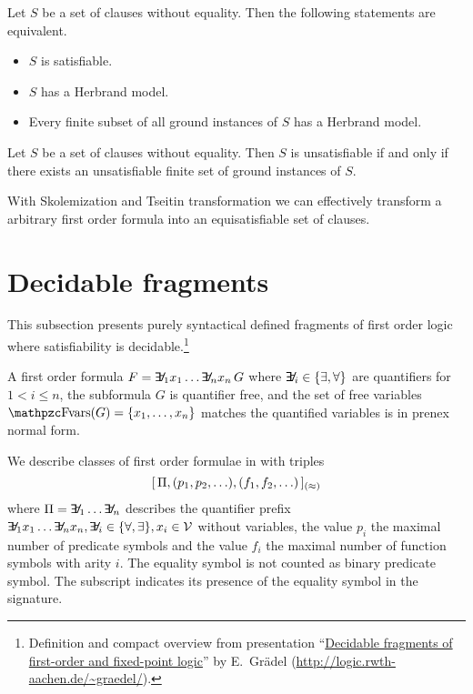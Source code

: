 \begin{theorem}[Herbrand]\label{the:herbrand}
	Let $S$ be a set of clauses without equality. Then the following statements are equivalent.
	\begin{itemize}
		\item $S$ is satisfiable.
		\item $S$ has a Herbrand model.
		\item Every finite subset of all ground instances of $S$ has a Herbrand model.
	\end{itemize} 
\end{theorem}

\begin{corollary}
	Let $S$ be a set of clauses without equality. 
	Then $S$ is unsatisfiable if and only if there exists 
	an unsatisfiable finite set of ground instances of $S$.
\end{corollary}

\begin{lemma}
With Skolemization and Tseitin transformation we can effectively transform a arbitrary first order formula into an equisatisfiable set of clauses.	
\end{lemma}



\section{Decidable fragments}\label{sec:decidable:fol:fragments}

This subsection presents purely syntactical defined fragments
of first order logic where satisfiability is decidable.\footnote{
	Definition and compact overview from presentation
	“\href{http://logic.rwth-aachen.de/~graedel/kalmar.pdf}{Decidable fragments of first-order and fixed-point logic}”
	by E.~Grädel (\url{http://logic.rwth-aachen.de/~graedel/}).	
}  



\begin{definition}[\PNF]
	A first order formula $F = \quantify_1 x_1 \ldots \quantify_n x_n\, G$ 
	where $\quantify_i \in \{\exists,\forall\}$ are quantifiers
	for $1 < i \leq n$,
	the subformula $G$ is quantifier free, and 
	the set of free variables $\fvar(G) = \{ x_1, \ldots, x_n \}$
	matches the quantified variables
	is in {\myem prenex normal form}.
\end{definition}


\begin{definition}[\cite{MR1482227}]\label{def:prefix:class}
	We describe classes of first order formulae in \PNF with triples
	\[
	[\, \Pi, (p_1,p_2,\ldots), (f_1,f_2,\ldots)\,]_{(\approx)}
	\]
	where $\Pi = \quantify_1 \ldots \quantify_n$ describes the quantifier prefix 
	$\quantify_1 x_1 \ldots \quantify_n x_n, \quantify_i\in\{\forall,\exists\}, x_i\in\mcV$ without variables,
	the value $p_i$ the maximal number of predicate symbols
	and the value $f_i$ the maximal number of function symbols with arity $i$.
	The equality symbol is not counted as binary predicate symbol.
	The subscript indicates its presence of the equality symbol in the signature. 
	
\end{definition}


